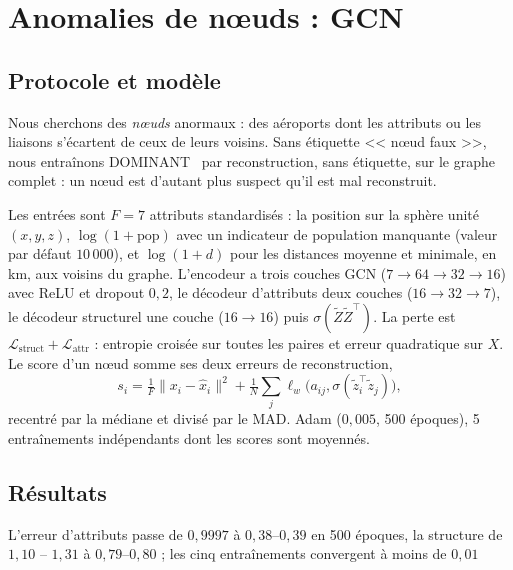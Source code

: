 \section{Anomalies de nœuds : GCN}
\label{sec:gcn}

\subsection{Protocole et modèle}

Nous cherchons des \emph{nœuds} anormaux : des aéroports dont les attributs ou les
liaisons s'écartent de ceux de leurs voisins. Sans étiquette << nœud faux >>, nous
entraînons DOMINANT~\cite{ding2019dominant} par reconstruction, sans étiquette, sur le
graphe complet : un nœud est d'autant plus suspect qu'il est mal reconstruit.

Les entrées sont $F=7$ attributs standardisés : la position sur la sphère unité
$(x,y,z)$, $\log(1+\text{pop})$
avec un indicateur de population manquante (valeur par défaut $10\,000$), et
$\log(1+d)$ pour les distances moyenne et minimale, en km, aux voisins du graphe. 
L'encodeur a trois couches GCN ($7\to64\to32\to16$) avec ReLU et dropout
$0{,}2$, le décodeur d'attributs deux couches ($16\to32\to7$), le décodeur
structurel une couche ($16\to16$) puis $\sigma(\tilde Z\tilde Z^\top)$. La perte
est $\mathcal{L}_{\mathrm{struct}}+\mathcal{L}_{\mathrm{attr}}$ : entropie croisée
sur toutes les paires et erreur quadratique sur $X$. 
Le score d'un nœud somme ses deux erreurs de reconstruction,
\[
s_i=\tfrac1F\lVert x_i-\hat x_i\rVert^2+\tfrac1N\textstyle\sum_{j}\ell_w\!\big(a_{ij},
\sigma(\tilde z_i^\top\tilde z_j)\big),
\]
recentré par la médiane et divisé par le MAD.
Adam ($0{,}005$, 500 époques), 5 entraînements indépendants dont les scores sont moyennés.

\subsection{Résultats}

L'erreur d'attributs passe de $0{,}9997$ à
$0{,}38$--$0{,}39$ en 500 époques, la structure de $1{,}10$ -- $1{,}31$ à
$0{,}79$--$0{,}80$ ; les cinq entraînements convergent à moins de $0{,}01$

